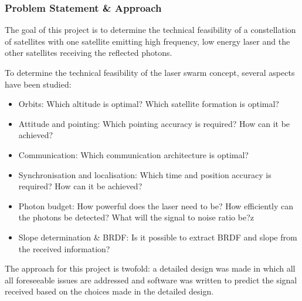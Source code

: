 \subsubsection{Problem Statement \& Approach}
The goal of this project is to determine the technical feasibility of a constellation of satellites with one satellite emitting high frequency, low energy laser and the other satellites receiving the reflected photons.

To determine the technical feasibility of the laser swarm concept, several aspects have been studied:

\begin{itemize}
\item Orbits: Which altitude is optimal? Which satellite formation is optimal?
\item Attitude and pointing: Which pointing accuracy is required? How can it be achieved?
\item Communication: Which communication architecture is optimal?
\item Synchronisation and localisation: Which time and position accuracy is required? How can it be achieved?
\item Photon budget: How powerful does the laser need to be? How efficiently can the photons be detected? What will the signal to noise ratio be?z
\item Slope determination \& BRDF: Is it possible to extract BRDF and slope from the received information?
\end{itemize}

The approach for this project is twofold: a detailed design was made in which all all foreseeable issues are addressed and software was written to predict the signal received based on the choices made in the detailed design.